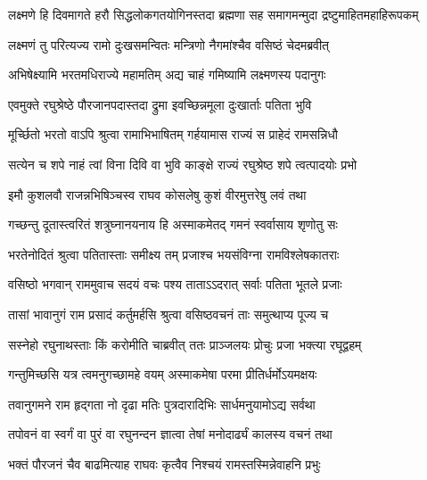 \fourlineindentedshloka
{लक्ष्मणे हि दिवमागते हरौ}
{सिद्धलोकगतयोगिनस्तदा}
{ब्रह्मणा सह समागमन्मुदा}
{द्रष्टुमाहितमहाहिरूपकम्} %






\twolineshloka
{लक्ष्मणं तु परित्यज्य रामो दुःखसमन्वितः}
{मन्त्रिणो नैगमांश्चैव वसिष्ठं चेदमब्रवीत्} %

\twolineshloka
{अभिषेक्ष्यामि भरतमधिराज्ये महामतिम्}
{अद्य चाहं गमिष्यामि लक्ष्मणस्य पदानुगः} %

\twolineshloka
{एवमुक्ते रघुश्रेष्ठे पौरजानपदास्तदा}
{द्रुमा इवच्छिन्नमूला दुःखार्ताः पतिता भुवि} %

\twolineshloka
{मूर्च्छितो भरतो वाऽपि श्रुत्वा रामाभिभाषितम्}
{गर्हयामास राज्यं स प्राहेदं रामसन्निधौ} %

\twolineshloka
{सत्येन च शपे नाहं त्वां विना दिवि वा भुवि}
{काङ्क्षे राज्यं रघुश्रेष्ठ शपे त्वत्पादयोः प्रभो} %

\twolineshloka
{इमौ कुशलवौ राजन्नभिषिञ्चस्व राघव}
{कोसलेषु कुशं वीरमुत्तरेषु लवं तथा} %

\twolineshloka
{गच्छन्तु दूतास्त्वरितं शत्रुघ्नानयनाय हि}
{अस्माकमेतद् गमनं स्वर्वासाय शृणोतु सः} %

\twolineshloka
{भरतेनोदितं श्रुत्वा पतितास्ताः समीक्ष्य तम्}
{प्रजाश्च भयसंविग्ना रामविश्लेषकातराः} %

\twolineshloka
{वसिष्ठो भगवान् राममुवाच सदयं वचः}
{पश्य ताताऽऽदरात् सर्वाः पतिता भूतले प्रजाः} %

\twolineshloka
{तासां भावानुगं राम प्रसादं कर्तुमर्हसि}
{श्रुत्वा वसिष्ठवचनं ताः समुत्थाप्य पूज्य च} %

\twolineshloka
{सस्नेहो रघुनाथस्ताः किं करोमीति चाब्रवीत्}
{ततः प्राञ्जलयः प्रोचुः प्रजा भक्त्या रघूद्वहम्} %

\twolineshloka
{गन्तुमिच्छसि यत्र त्वमनुगच्छामहे वयम्}
{अस्माकमेषा परमा प्रीतिर्धर्मोऽयमक्षयः} %

\twolineshloka
{तवानुगमने राम हृद्गता नो दृढा मतिः}
{पुत्रदारादिभिः सार्धमनुयामोऽद्य सर्वथा} %

\twolineshloka
{तपोवनं वा स्वर्गं वा पुरं वा रघुनन्दन}
{ज्ञात्वा तेषां मनोदार्ढ्यं कालस्य वचनं तथा} %

\twolineshloka
{भक्तं पौरजनं चैव बाढमित्याह राघवः}
{कृत्वैव निश्चयं रामस्तस्मिन्नेवाहनि प्रभुः} %

